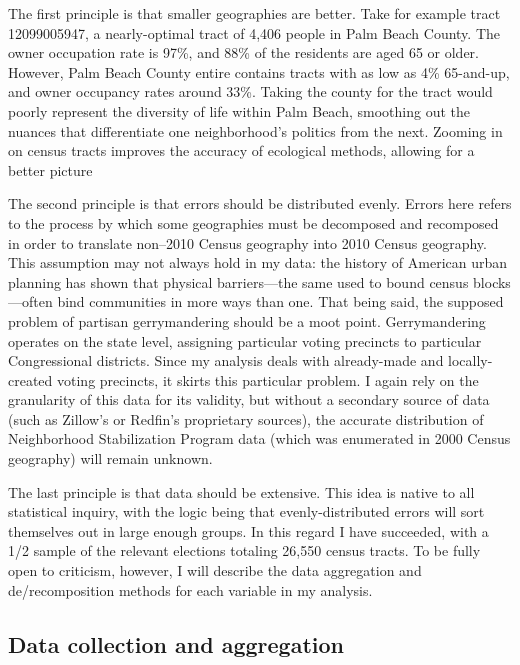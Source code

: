 \documentclass[
]{article}
\begin{document}
The first principle is that smaller geographies are better.
Take for example tract 12099005947, a nearly-optimal tract of 4,406 people in Palm Beach County.
The owner occupation rate is 97\%, and 88\% of the residents are aged 65 or older.
However, Palm Beach County entire contains tracts with as low as 4\% 65-and-up, and owner occupancy rates around 33\%.
Taking the county for the tract would poorly represent the diversity of life within Palm Beach, smoothing out the nuances that differentiate one neighborhood's politics from the next.
Zooming in on census tracts improves the accuracy of ecological methods, allowing for a better picture

The second principle is that errors should be distributed evenly.
Errors here refers to the process by which some geographies must be decomposed and recomposed in order to translate non--2010 Census geography into 2010 Census geography.
This assumption may not always hold in my data: the history of American urban planning has shown that physical barriers---the same used to bound census blocks---often bind communities in more ways than one.
That being said, the supposed problem of partisan gerrymandering should be a moot point.
Gerrymandering operates on the state level, assigning particular voting precincts to particular Congressional districts.
Since my analysis deals with already-made and locally-created voting precincts, it skirts this particular problem.
I again rely on the granularity of this data for its validity, but without a secondary source of data (such as Zillow's or Redfin's proprietary sources), the accurate distribution of Neighborhood Stabilization Program data (which was enumerated in 2000 Census geography) will remain unknown.

The last principle is that data should be extensive.
This idea is native to all statistical inquiry, with the logic being that evenly-distributed errors will sort themselves out in large enough groups.
In this regard I have succeeded, with a 1/2 sample of the relevant elections totaling 26,550 census tracts.
To be fully open to criticism, however, I will describe the data aggregation and de/recomposition methods for each variable in my analysis.

\hypertarget{data-collection-and-aggregation}{%
\subsection{Data collection and aggregation}\label{data-collection-and-aggregation}}
\end{document}
